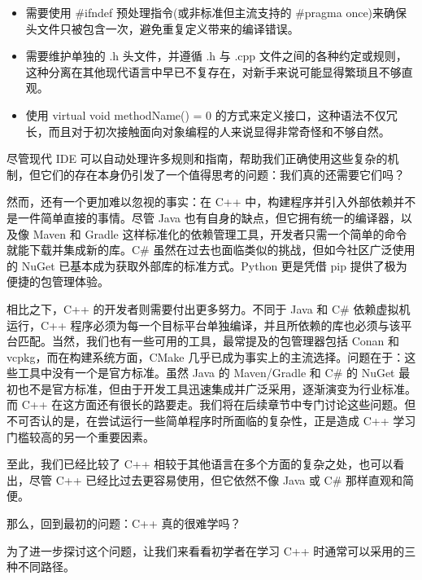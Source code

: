 \begin{itemize}
\item 
需要使用 \#ifndef 预处理指令(或非标准但主流支持的 \#pragma once)来确保头文件只被包含一次，避免重复定义带来的编译错误。

\item 
需要维护单独的 .h 头文件，并遵循 .h 与 .cpp 文件之间的各种约定或规则，这种分离在其他现代语言中早已不复存在，对新手来说可能显得繁琐且不够直观。

\item 
使用 virtual void methodName() = 0 的方式来定义接口，这种语法不仅冗长，而且对于初次接触面向对象编程的人来说显得非常奇怪和不够自然。
\end{itemize}

尽管现代 IDE 可以自动处理许多规则和指南，帮助我们正确使用这些复杂的机制，但它们的存在本身仍引发了一个值得思考的问题：我们真的还需要它们吗？

然而，还有一个更加难以忽视的事实：在 C++ 中，构建程序并引入外部依赖并不是一件简单直接的事情。尽管 Java 也有自身的缺点，但它拥有统一的编译器，以及像 Maven 和 Gradle 这样标准化的依赖管理工具，开发者只需一个简单的命令就能下载并集成新的库。C\# 虽然在过去也面临类似的挑战，但如今社区广泛使用的 NuGet 已基本成为获取外部库的标准方式。Python 更是凭借 pip 提供了极为便捷的包管理体验。

相比之下，C++ 的开发者则需要付出更多努力。不同于 Java 和 C\# 依赖虚拟机运行，C++ 程序必须为每一个目标平台单独编译，并且所依赖的库也必须与该平台匹配。当然，我们也有一些可用的工具，最常提及的包管理器包括 Conan 和 vcpkg，而在构建系统方面，CMake 几乎已成为事实上的主流选择。问题在于：这些工具中没有一个是官方标准。虽然 Java 的 Maven/Gradle 和 C\# 的 NuGet 最初也不是官方标准，但由于开发工具迅速集成并广泛采用，逐渐演变为行业标准。而 C++ 在这方面还有很长的路要走。我们将在后续章节中专门讨论这些问题。但不可否认的是，在尝试运行一些简单程序时所面临的复杂性，正是造成 C++ 学习门槛较高的另一个重要因素。

至此，我们已经比较了 C++ 相较于其他语言在多个方面的复杂之处，也可以看出，尽管 C++ 已经比过去更容易使用，但它依然不像 Java 或 C\# 那样直观和简便。

那么，回到最初的问题：C++ 真的很难学吗？

为了进一步探讨这个问题，让我们来看看初学者在学习 C++ 时通常可以采用的三种不同路径。



